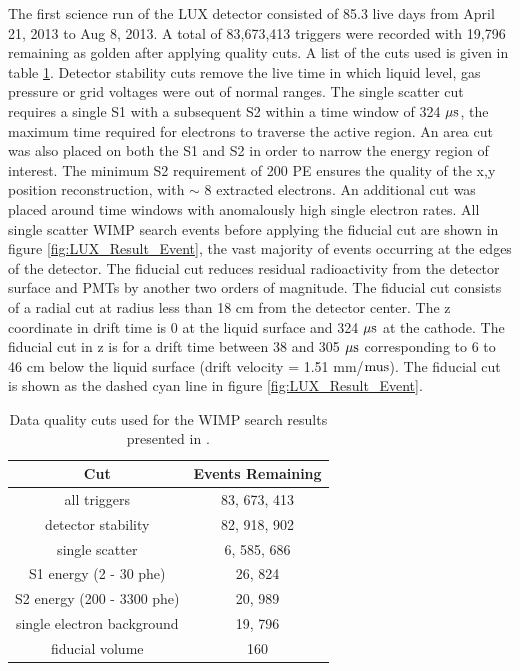 The first science run of the LUX detector consisted of 85.3 live days from April 21, 2013 to Aug 8, 2013. A total of 83,673,413 triggers were recorded with 19,796 remaining as golden after applying quality cuts. A list of the cuts used is given in table \ref{table:WIMP_Quality_Cuts}.  Detector stability cuts remove the live time in which liquid level, gas pressure or grid voltages were out of normal ranges. The single scatter cut requires a single S1 with a subsequent S2 within a time window of 324 $\rm \mu s$, the maximum time required for electrons to traverse the active region. An area cut was also placed on both the S1 and S2 in order to narrow the energy region of interest. The minimum S2 requirement of 200 PE ensures the quality of the x,y position reconstruction, with $\sim$ 8 extracted electrons. An additional cut was placed around time windows with anomalously high single electron rates. All single scatter WIMP search events before applying the fiducial cut are shown in figure \ref{fig:LUX_Result_Event}, the vast majority of events occurring at the edges of the detector. 
The fiducial cut reduces residual radioactivity from the detector surface and PMTs by another two orders of magnitude. The fiducial cut consists of a radial cut at radius less than 18 cm from the detector center. The z coordinate in drift time is 0 at the liquid surface and 324 $\rm \mu s$ at the cathode. The fiducial cut in z is for a drift time between 38 and 305 $\rm \mu s$ corresponding to 6 to 46 cm below the liquid surface (drift velocity = 1.51 mm/$\rm mu s$). The fiducial cut is shown as the dashed cyan line in figure \ref{fig:LUX_Result_Event}.

\renewcommand{\baselinestretch}{1}
\small\normalsize
\begin{table}[h!]
\begin{center}
\begin{tabular}{|c|c|}
\hline
Cut & Events Remaining \\ \hline
all triggers & 83, 673, 413 \\ \hline
detector stability & 82, 918, 902 \\ \hline
single scatter & 6, 585, 686 \\ \hline
S1 energy (2 - 30 phe) & 26, 824 \\ \hline
S2 energy (200 - 3300 phe) &  20, 989 \\ \hline
single electron background & 19, 796 \\ \hline
fiducial volume & 160 \\ \hline
\end{tabular}
\caption{Data quality cuts used for the WIMP search results presented in \cite{LUX_PRL}.}
\label{table:WIMP_Quality_Cuts}
\end{center}
\end{table}
\renewcommand{\baselinestretch}{2}
\small\normalsize

